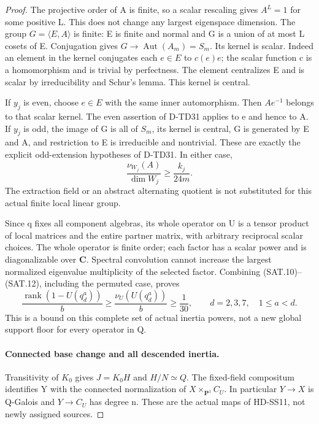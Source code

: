 \begin{proof}
The projective order of A is finite, so a scalar rescaling gives
\(A^L=1\) for some positive L. This does not change any largest
eigenspace dimension. The group \(G=\langle E,A\rangle\) is
finite: E is finite and normal and G is a union of at most L
cosets of E. Conjugation gives
\(G\to\operatorname{Aut}(A_m)=S_m\). Its kernel is scalar.
Indeed an element in the kernel conjugates each \(e\in E\)
to \(c(e)e\); the scalar function c is a homomorphism and is
trivial by perfectness. The element centralizes E and is scalar
by irreducibility and Schur's lemma. This kernel is central.

If \(y_j\) is even, choose \(e\in E\) with the same inner
automorphism. Then \(Ae^{-1}\) belongs to that scalar kernel.
The even assertion of D-TD31 applies to e and hence to A.
If \(y_j\) is odd, the image of G is all of \(S_m\), its
kernel is central, G is generated by E and A, and restriction
to E is irreducible and nontrivial. These are exactly the
explicit odd-extension hypotheses of D-TD31. In either case,
\[
             \frac{\nu_{W_j}(A)}{\dim W_j}
                         \ge\frac{k_j}{24m}.
 \tag{SAT.12}
\]
The extraction field or an abstract alternating quotient is not
substituted for this actual finite local linear group.

Since q fixes all component algebras, its whole operator on U is
a tensor product of local matrices and the entire partner matrix,
with arbitrary reciprocal scalar choices. The whole operator is
finite order; each factor has a scalar power and is diagonalizable
over \(\mathbf C\). Spectral convolution cannot increase the
largest normalized eigenvalue multiplicity of the selected factor.
Combining (SAT.10)--(SAT.12), including the permuted case, proves
\[
 \frac{\operatorname{rank}(1-U(q_d^a))}{b}
       \ge\frac{\nu_U(U(q_d^a))}{b}\ge\frac1{30},
 \qquad d=2,3,7,\quad 1\le a<d.
 \tag{SAT.13}
\]
This is a bound on this complete set of actual inertia powers,
not a new global support floor for every operator in Q.

\paragraph{Connected base change and all descended inertia.}
Transitivity of \(K_0\) gives \(J=K_0H\) and
\(H/N\simeq Q\). The fixed-field compositum identifies Y
with the connected normalization of
\(X\times_{\mathbf P^1}C_U\). In particular \(Y\to X\)
is Q-Galois and \(Y\to C_U\) has degree n. These are the
actual maps of HD-SS11, not newly assigned sources.


\end{proof}
